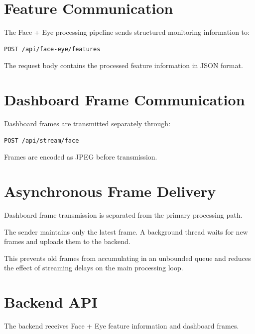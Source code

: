 \documentclass{tietreport}
\begin{document}

\section{Feature Communication}

The Face + Eye processing pipeline sends structured monitoring
information to:

\begin{lstlisting}
POST /api/face-eye/features
\end{lstlisting}

The request body contains the processed feature information in JSON
format.


\section{Dashboard Frame Communication}

Dashboard frames are transmitted separately through:

\begin{lstlisting}
POST /api/stream/face
\end{lstlisting}

Frames are encoded as JPEG before transmission.


\section{Asynchronous Frame Delivery}

Dashboard frame transmission is separated from the primary processing
path.

The sender maintains only the latest frame. A background thread waits
for new frames and uploads them to the backend.

This prevents old frames from accumulating in an unbounded queue and
reduces the effect of streaming delays on the main processing loop.


\section{Backend API}

The backend receives Face + Eye feature information and dashboard
frames.
\end{document}
